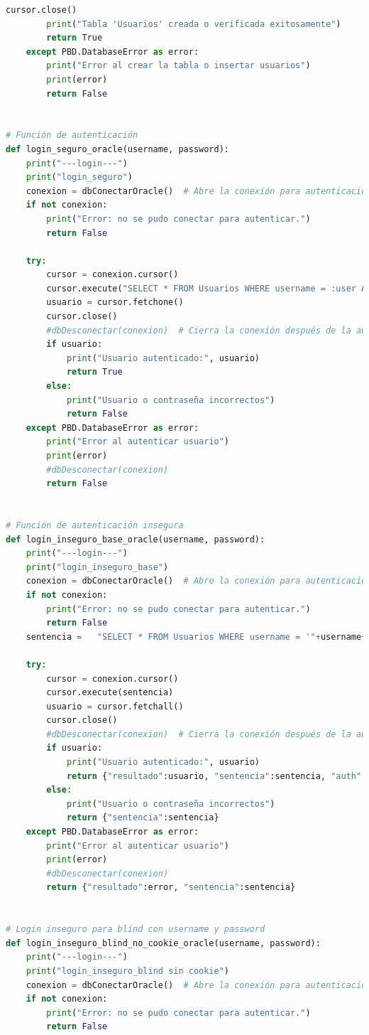 \documentclass[a4paper,12pt]{article}
\begin{document}
\begin{lstlisting}[language=Python]
        cursor.close()
        print("Tabla 'Usuarios' creada o verificada exitosamente")
        return True
    except PBD.DatabaseError as error:
        print("Error al crear la tabla o insertar usuarios")
        print(error)
        return False


# Función de autenticación
def login_seguro_oracle(username, password):
    print("---login---")
    print("login_seguro")
    conexion = dbConectarOracle()  # Abre la conexión para autenticación
    if not conexion:
        print("Error: no se pudo conectar para autenticar.")
        return False

    try:
        cursor = conexion.cursor()
        cursor.execute("SELECT * FROM Usuarios WHERE username = :user AND password = :pass", (username, password))
        usuario = cursor.fetchone()
        cursor.close()
        #dbDesconectar(conexion)  # Cierra la conexión después de la autenticación
        if usuario:
            print("Usuario autenticado:", usuario)
            return True
        else:
            print("Usuario o contraseña incorrectos")
            return False
    except PBD.DatabaseError as error:
        print("Error al autenticar usuario")
        print(error)
        #dbDesconectar(conexion)
        return False


# Función de autenticación insegura
def login_inseguro_base_oracle(username, password):
    print("---login---")
    print("login_inseguro_base")
    conexion = dbConectarOracle()  # Abre la conexión para autenticación
    if not conexion:
        print("Error: no se pudo conectar para autenticar.")
        return False
    sentencia =   "SELECT * FROM Usuarios WHERE username = '"+username+"' AND password = '"+password+"'"

    try:
        cursor = conexion.cursor()
        cursor.execute(sentencia)
        usuario = cursor.fetchall()
        cursor.close()
        #dbDesconectar(conexion)  # Cierra la conexión después de la autenticación
        if usuario:
            print("Usuario autenticado:", usuario)
            return {"resultado":usuario, "sentencia":sentencia, "auth":"true"}
        else:
            print("Usuario o contraseña incorrectos")
            return {"sentencia":sentencia}
    except PBD.DatabaseError as error:
        print("Error al autenticar usuario")
        print(error)
        #dbDesconectar(conexion)
        return {"resultado":error, "sentencia":sentencia}


# Login inseguro para blind con username y password
def login_inseguro_blind_no_cookie_oracle(username, password):
    print("---login---")
    print("login_inseguro_blind sin cookie")
    conexion = dbConectarOracle()  # Abre la conexión para autenticación
    if not conexion:
        print("Error: no se pudo conectar para autenticar.")
        return False


\end{lstlisting}
\end{document}
